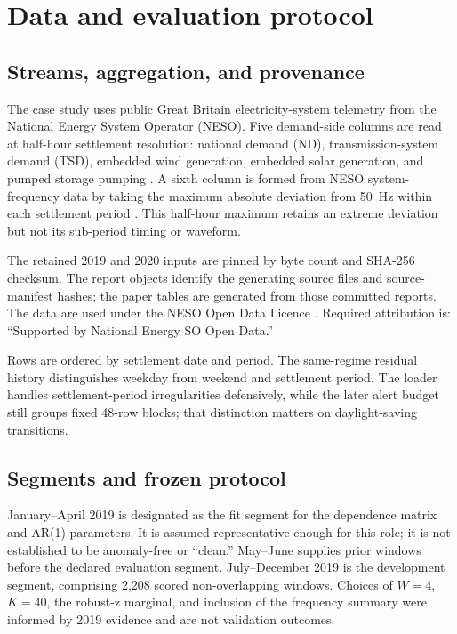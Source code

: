 \section{Data and evaluation protocol}
\label{sec:protocol}

\subsection{Streams, aggregation, and provenance}

The case study uses public Great Britain electricity-system telemetry from the
National Energy System Operator (NESO). Five demand-side columns are read at
half-hour settlement resolution: national demand (ND), transmission-system
demand (TSD), embedded wind generation, embedded solar generation, and pumped
storage pumping \citep{neso2019historicdemand}. A sixth column is formed from
NESO system-frequency data by taking the maximum absolute deviation from
50~Hz within each settlement period \citep{neso2019systemfrequency}. This
half-hour maximum retains an extreme deviation but not its sub-period timing or
waveform.

The retained 2019 and 2020 inputs are pinned by byte count and SHA-256 checksum.
The report objects identify the generating source files and source-manifest
hashes; the paper tables are generated from those committed reports. The data
are used under the NESO Open Data Licence \citep{nesoOpenLicence}. Required
attribution is: ``Supported by National Energy SO Open Data.''

Rows are ordered by settlement date and period. The same-regime residual
history distinguishes weekday from weekend and settlement period. The loader
handles settlement-period irregularities defensively, while the later alert
budget still groups fixed 48-row blocks; that distinction matters on
daylight-saving transitions.

\subsection{Segments and frozen protocol}

January--April 2019 is designated as the fit segment for the dependence matrix
and AR(1) parameters. It is assumed representative enough for this role; it is
not established to be anomaly-free or ``clean.'' May--June supplies prior
windows before the declared evaluation segment. July--December 2019 is the
development segment, comprising 2,208 scored non-overlapping windows. Choices
of $W=4$, $K=40$, the robust-z marginal, and inclusion of the frequency summary
were informed by 2019 evidence and are not validation outcomes.

